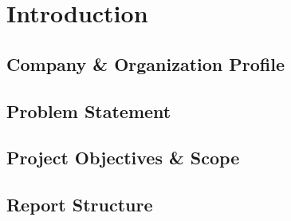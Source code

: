 \chapter{Introduction}
\label{chap:introduction}

\section{Company \& Organization Profile}

\section{Problem Statement}

\section{Project Objectives \& Scope}

\section{Report Structure}
